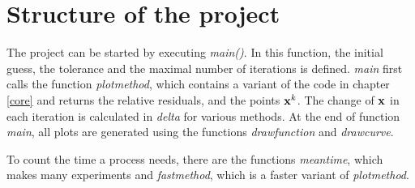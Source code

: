 \documentclass[a4paper,11pt]{article}
\newcommand{\code}[1]{\textit{#1}}
\begin{document}
\section{Structure of the project}\label{chap:arch}
The project can be started by executing \code{main()}. 
In this function, the initial guess, the tolerance and the maximal number of iterations is defined. 
\code{main} first calls the function \code{plotmethod}, which contains a variant of the code in chapter \ref{core} and returns the relative residuals, and the points ${\bf x}^{k}$.
The change of $\bf x$ in each iteration is calculated in \code{delta} for various methods.
At the end of function \code{main}, all plots are generated using the functions \code{drawfunction} and \code{drawcurve}.

To count the time a process needs, there are the functions \code{meantime}, which makes many experiments and \code{fastmethod}, which is a faster variant of \code{plotmethod}.
\end{document}
